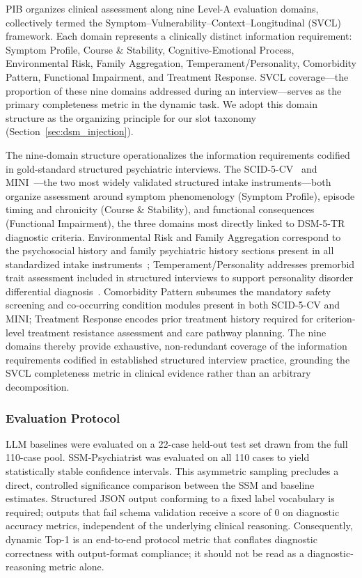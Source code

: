 \documentclass[conference]{IEEEtran}
\begin{document}
PIB organizes clinical assessment along nine Level-A evaluation domains, collectively termed the Symptom--Vulnerability--Context--Longitudinal (SVCL) framework. Each domain represents a clinically distinct information requirement: Symptom Profile, Course \& Stability, Cognitive-Emotional Process, Environmental Risk, Family Aggregation, Temperament/Personality, Comorbidity Pattern, Functional Impairment, and Treatment Response. SVCL coverage---the proportion of these nine domains addressed during an interview---serves as the primary completeness metric in the dynamic task. We adopt this domain structure as the organizing principle for our slot taxonomy (Section~\ref{sec:dsm_injection}).

The nine-domain structure operationalizes the information requirements codified in gold-standard structured psychiatric interviews. The SCID-5-CV~\cite{first2015structured} and MINI~\cite{sheehan1998mini}---the two most widely validated structured intake instruments---both organize assessment around symptom phenomenology (Symptom Profile), episode timing and chronicity (Course \& Stability), and functional consequences (Functional Impairment), the three domains most directly linked to DSM-5-TR diagnostic criteria. Environmental Risk and Family Aggregation correspond to the psychosocial history and family psychiatric history sections present in all standardized intake instruments~\cite{first2015structured,sheehan1998mini}; Temperament/Personality addresses premorbid trait assessment included in structured interviews to support personality disorder differential diagnosis~\cite{first2015structured}. Comorbidity Pattern subsumes the mandatory safety screening and co-occurring condition modules present in both SCID-5-CV and MINI; Treatment Response encodes prior treatment history required for criterion-level treatment resistance assessment and care pathway planning. The nine domains thereby provide exhaustive, non-redundant coverage of the information requirements codified in established structured interview practice, grounding the SVCL completeness metric in clinical evidence rather than an arbitrary decomposition.

\subsubsection{Evaluation Protocol}

LLM baselines were evaluated on a 22-case held-out test set drawn from the full 110-case pool. SSM-Psychiatrist was evaluated on all 110 cases to yield statistically stable confidence intervals. This asymmetric sampling precludes a direct, controlled significance comparison between the SSM and baseline estimates. Structured JSON output conforming to a fixed label vocabulary is required; outputs that fail schema validation receive a score of 0 on diagnostic accuracy metrics, independent of the underlying clinical reasoning. Consequently, dynamic Top-1 is an end-to-end protocol metric that conflates diagnostic correctness with output-format compliance; it should not be read as a diagnostic-reasoning metric alone.
\end{document}
